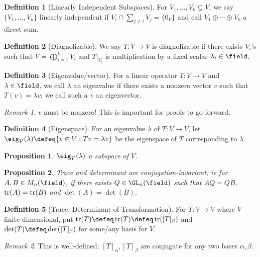 \documentclass[12pt, oneside]{article}
\theoremstyle{definition}
\newtheorem{defn}{Definition}
\theoremstyle{plain}
\newtheorem{prop}{Proposition}
\theoremstyle{remark}
\newtheorem{remark}{Remark}
\begin{document}
\begin{defn}[Linearly Independent Subspaces]
  For $V_1, \dots, V_k \subseteq V$, we say $\{V_1, \dots, V_k\}$ linearly independent if $V_i \cap \sum_{j \neq i} V_j = \{0_V\}$ and call $V_1 \oplus \cdots \oplus V_k$ a direct sum.
\end{defn}

\begin{defn}[Diagnolizable]
  We say $T : V \to V$ is diagnolizable if there exists $V_i$'s such that $V = \bigoplus_{i=1}^k V_i$ and $T\vert_{V_i}$ is multiplication by a fixed scalar $\lambda_i \in \field$.
\end{defn}

\begin{defn}[Eigenvalue/vector]
  For a linear operator $T : V \to V$ and $\lambda \in \field$, we call $\lambda$ an eigenvalue if there exists a nonzero vector $v$ such that $T(v) = \lambda v$; we call such a $v$ an eigenvector.
\end{defn}

\begin{remark}
  $v$ must be nonzero! This is important for proofs to go forward.
\end{remark}

\begin{defn}[Eigenspace]
  For an eigenvalue $\lambda$ of $T : V \to V$, let $\eig_V(\lambda) \defeq \{v \in V : Tv = \lambda v\}$ be the eigenspace of $T$ corresponding to $\lambda$.
\end{defn}

\begin{prop}
  $\eig_V(\lambda)$ a subspace of $V$.
\end{prop}

\begin{prop}
  Trace and determinant are conjugation-invariant; ie for $A, B \in M_n(\field)$, if there exists $Q \in \GL_n(\field)$ such that $AQ = QB$, $\tr(A) =\tr(B)$ and $\det(A) = \det(B)$.
\end{prop}

\begin{defn}[Trace, Determinant of Transformation]
  For $T : V \to V$ where $V$ finite dimensional, put $\tr(T) \defeq \tr(T) \defeq \tr([T]_\beta)$ and $\det(T) \defeq \det([T]_\beta)$ for some/any basis for $V$.
\end{defn}

\begin{remark}
  This is well-defined; $[T]_\alpha, [T]_\beta$ are conjugate for any two bases $\alpha, \beta$.
\end{remark}
\end{document}
